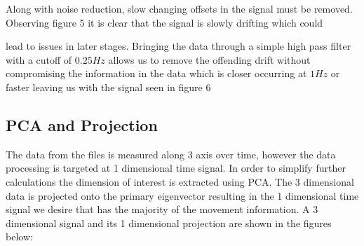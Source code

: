 \documentclass[10pt,twocolumn,letterpaper]{article}
\begin{document}
\begin{figure}[t]
\begin{center}
\fbox{\rule{0pt}{2in} \rule{0.9\linewidth}{0pt}}
   \caption{}
\end{center}
\end{figure}

Along with noise reduction, slow changing offsets in the signal must be removed.  Observing figure 5 it is clear that the signal is slowly drifting which could

\begin{figure}[t]
\begin{center}
\fbox{\rule{0pt}{2in} \rule{0.9\linewidth}{0pt}}
   \caption{}
\end{center}
\end{figure}

lead to issues in later stages.  Bringing the data through a simple high pass filter with a cutoff of $0.25 Hz$ allows us to remove the offending drift without compromising the information in the data which is closer occurring at $1Hz$ or faster leaving us with the signal seen in figure 6

\begin{figure}[t]
\begin{center}
\fbox{\rule{0pt}{2in} \rule{0.9\linewidth}{0pt}}
   \caption{}
\end{center}
\end{figure}

\subsection{PCA and Projection}

The data from the files is measured along 3 axis over time, however the data processing is targeted at 1 dimensional time signal.  In order to simplify further calculations the dimension of interest is extracted using PCA.  The 3 dimensional data is projected onto the primary eigenvector resulting in the 1 dimensional time signal we desire that has the majority of the movement information.  A 3 dimensional signal and its 1 dimensional projection are shown in the figures below:

\begin{figure}[t]
\begin{center}
\fbox{\rule{0pt}{2in} \rule{0.9\linewidth}{0pt}}
   \caption{}
\end{center}
\end{figure}
\end{document}
